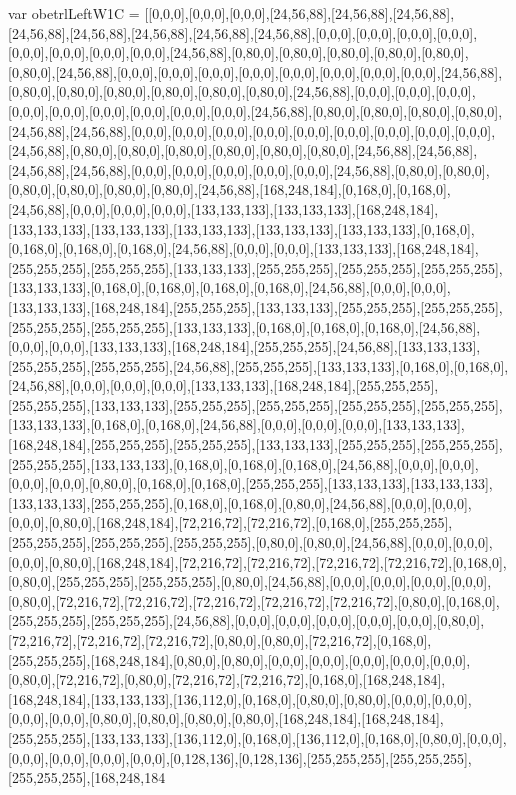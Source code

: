 var obetrlLeftW1C = [[0,0,0],[0,0,0],[0,0,0],[24,56,88],[24,56,88],[24,56,88],[24,56,88],[24,56,88],[24,56,88],[24,56,88],[24,56,88],[0,0,0],[0,0,0],[0,0,0],[0,0,0],[0,0,0],[0,0,0],[0,0,0],[0,0,0],[24,56,88],[0,80,0],[0,80,0],[0,80,0],[0,80,0],[0,80,0],[0,80,0],[24,56,88],[0,0,0],[0,0,0],[0,0,0],[0,0,0],[0,0,0],[0,0,0],[0,0,0],[0,0,0],[24,56,88],[0,80,0],[0,80,0],[0,80,0],[0,80,0],[0,80,0],[0,80,0],[24,56,88],[0,0,0],[0,0,0],[0,0,0],[0,0,0],[0,0,0],[0,0,0],[0,0,0],[0,0,0],[0,0,0],[24,56,88],[0,80,0],[0,80,0],[0,80,0],[0,80,0],[24,56,88],[24,56,88],[0,0,0],[0,0,0],[0,0,0],[0,0,0],[0,0,0],[0,0,0],[0,0,0],[0,0,0],[0,0,0],[24,56,88],[0,80,0],[0,80,0],[0,80,0],[0,80,0],[0,80,0],[0,80,0],[24,56,88],[24,56,88],[24,56,88],[24,56,88],[0,0,0],[0,0,0],[0,0,0],[0,0,0],[0,0,0],[24,56,88],[0,80,0],[0,80,0],[0,80,0],[0,80,0],[0,80,0],[0,80,0],[24,56,88],[168,248,184],[0,168,0],[0,168,0],[24,56,88],[0,0,0],[0,0,0],[0,0,0],[133,133,133],[133,133,133],[168,248,184],[133,133,133],[133,133,133],[133,133,133],[133,133,133],[133,133,133],[0,168,0],[0,168,0],[0,168,0],[0,168,0],[24,56,88],[0,0,0],[0,0,0],[133,133,133],[168,248,184],[255,255,255],[255,255,255],[133,133,133],[255,255,255],[255,255,255],[255,255,255],[133,133,133],[0,168,0],[0,168,0],[0,168,0],[0,168,0],[24,56,88],[0,0,0],[0,0,0],[133,133,133],[168,248,184],[255,255,255],[133,133,133],[255,255,255],[255,255,255],[255,255,255],[255,255,255],[133,133,133],[0,168,0],[0,168,0],[0,168,0],[24,56,88],[0,0,0],[0,0,0],[133,133,133],[168,248,184],[255,255,255],[24,56,88],[133,133,133],[255,255,255],[255,255,255],[24,56,88],[255,255,255],[133,133,133],[0,168,0],[0,168,0],[24,56,88],[0,0,0],[0,0,0],[0,0,0],[133,133,133],[168,248,184],[255,255,255],[255,255,255],[133,133,133],[255,255,255],[255,255,255],[255,255,255],[255,255,255],[133,133,133],[0,168,0],[0,168,0],[24,56,88],[0,0,0],[0,0,0],[0,0,0],[133,133,133],[168,248,184],[255,255,255],[255,255,255],[133,133,133],[255,255,255],[255,255,255],[255,255,255],[133,133,133],[0,168,0],[0,168,0],[0,168,0],[24,56,88],[0,0,0],[0,0,0],[0,0,0],[0,0,0],[0,80,0],[0,168,0],[0,168,0],[255,255,255],[133,133,133],[133,133,133],[133,133,133],[255,255,255],[0,168,0],[0,168,0],[0,80,0],[24,56,88],[0,0,0],[0,0,0],[0,0,0],[0,80,0],[168,248,184],[72,216,72],[72,216,72],[0,168,0],[255,255,255],[255,255,255],[255,255,255],[255,255,255],[0,80,0],[0,80,0],[24,56,88],[0,0,0],[0,0,0],[0,0,0],[0,80,0],[168,248,184],[72,216,72],[72,216,72],[72,216,72],[72,216,72],[0,168,0],[0,80,0],[255,255,255],[255,255,255],[0,80,0],[24,56,88],[0,0,0],[0,0,0],[0,0,0],[0,0,0],[0,80,0],[72,216,72],[72,216,72],[72,216,72],[72,216,72],[72,216,72],[0,80,0],[0,168,0],[255,255,255],[255,255,255],[24,56,88],[0,0,0],[0,0,0],[0,0,0],[0,0,0],[0,0,0],[0,80,0],[72,216,72],[72,216,72],[72,216,72],[0,80,0],[0,80,0],[72,216,72],[0,168,0],[255,255,255],[168,248,184],[0,80,0],[0,80,0],[0,0,0],[0,0,0],[0,0,0],[0,0,0],[0,0,0],[0,80,0],[72,216,72],[0,80,0],[72,216,72],[72,216,72],[0,168,0],[168,248,184],[168,248,184],[133,133,133],[136,112,0],[0,168,0],[0,80,0],[0,80,0],[0,0,0],[0,0,0],[0,0,0],[0,0,0],[0,80,0],[0,80,0],[0,80,0],[0,80,0],[168,248,184],[168,248,184],[255,255,255],[133,133,133],[136,112,0],[0,168,0],[136,112,0],[0,168,0],[0,80,0],[0,0,0],[0,0,0],[0,0,0],[0,0,0],[0,0,0],[0,128,136],[0,128,136],[255,255,255],[255,255,255],[255,255,255],[168,248,184